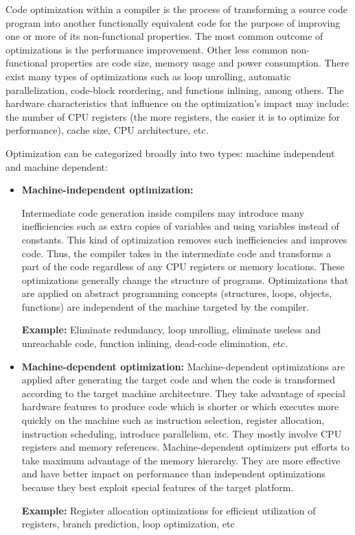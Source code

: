 Code optimization within a compiler is the process of transforming a source code program into another functionally equivalent code for the purpose of improving one or more of its non-functional properties. 
The most common outcome of optimizations is the performance improvement. Other less common non-functional properties are code size, memory usage and power consumption. 
There exist many types of optimizations such as loop unrolling, automatic parallelization, code-block reordering, and functions inlining, among others. The hardware characteristics that influence on the optimization's impact may include: the number of CPU registers (the more registers, the easier it is to optimize for performance), cache size, CPU architecture, etc.

Optimization can be categorized broadly into two types: machine independent and machine dependent: 
\begin{itemize}
	
	\item \textbf{Machine-independent optimization:}
	
	Intermediate code generation inside compilers may introduce many inefficiencies such as extra copies of variables and using variables instead of
	constants.
	This kind of optimization removes such inefficiencies and improves code. Thus, the compiler takes in the intermediate code and transforms a part of the code regardless of any CPU registers or memory locations. These optimizations generally change the structure of programs.
	Optimizations that are applied on abstract programming concepts (structures, loops, objects, functions) are independent of the machine targeted by the compiler.
	
	\textbf{Example:} Eliminate redundancy, loop unrolling, eliminate useless and unreachable code, function inlining, dead-code elimination, etc.
	
	\item \textbf{Machine-dependent optimization:} 
	Machine-dependent optimizations are applied after generating the target code and when the code is transformed according to the target machine architecture. They take advantage of special hardware features to produce code which is shorter or which executes more quickly on the machine such as instruction selection, register allocation, instruction scheduling, introduce parallelism, etc.
	They mostly involve CPU registers and memory references. Machine-dependent optimizers put efforts to take maximum advantage of the memory hierarchy. They are more effective and have better impact on performance than independent optimizations because they best exploit special features of the target platform.
	
	\textbf{Example:} Register allocation optimizations for efficient utilization of registers, branch prediction, loop optimization, etc
 
 
\end{itemize}
 

